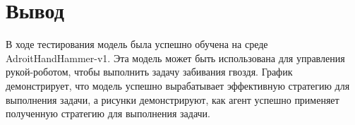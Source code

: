 \section*{Вывод}

В ходе тестирования модель была успешно обучена на среде AdroitHandHammer-v1. 
Эта модель может быть использована для управления рукой-роботом, чтобы выполнить задачу забивания гвоздя.
График демонстрирует, что модель успешно вырабатывает эффективную стратегию для выполнения задачи, 
а рисунки демонстрируют, как агент успешно применяет полученную стратегию для выполнения задачи.

\clearpage
